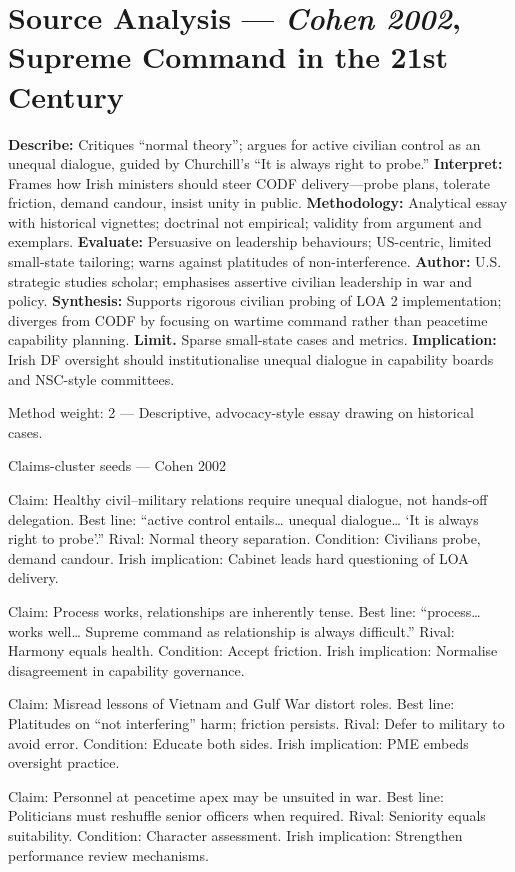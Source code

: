 \section*{Source Analysis — \textit{Cohen 2002}, Supreme Command in the 21st Century}
\textbf{Describe:} Critiques “normal theory”; argues for active civilian control as an unequal dialogue, guided by Churchill’s “It is always right to probe.”
\textbf{Interpret:} Frames how Irish ministers should steer CODF delivery—probe plans, tolerate friction, demand candour, insist unity in public.
\textbf{Methodology:} Analytical essay with historical vignettes; doctrinal not empirical; validity from argument and exemplars.
\textbf{Evaluate:} Persuasive on leadership behaviours; US-centric, limited small-state tailoring; warns against platitudes of non-interference.
\textbf{Author:} U.S. strategic studies scholar; emphasises assertive civilian leadership in war and policy.
\textbf{Synthesis:} Supports rigorous civilian probing of LOA 2 implementation; diverges from CODF by focusing on wartime command rather than peacetime capability planning.
\textbf{Limit.} Sparse small-state cases and metrics.
\textbf{Implication:} Irish DF oversight should institutionalise unequal dialogue in capability boards and NSC-style committees.

Method weight: 2 — Descriptive, advocacy-style essay drawing on historical cases.

Claims-cluster seeds — Cohen 2002

Claim: Healthy civil–military relations require unequal dialogue, not hands-off delegation. Best line: “active control entails… unequal dialogue… ‘It is always right to probe’.” Rival: Normal theory separation. Condition: Civilians probe, demand candour. Irish implication: Cabinet leads hard questioning of LOA delivery.

Claim: Process works, relationships are inherently tense. Best line: “process… works well… Supreme command as relationship is always difficult.” Rival: Harmony equals health. Condition: Accept friction. Irish implication: Normalise disagreement in capability governance.

Claim: Misread lessons of Vietnam and Gulf War distort roles. Best line: Platitudes on “not interfering” harm; friction persists. Rival: Defer to military to avoid error. Condition: Educate both sides. Irish implication: PME embeds oversight practice.

Claim: Personnel at peacetime apex may be unsuited in war. Best line: Politicians must reshuffle senior officers when required. Rival: Seniority equals suitability. Condition: Character assessment. Irish implication: Strengthen performance review mechanisms.


